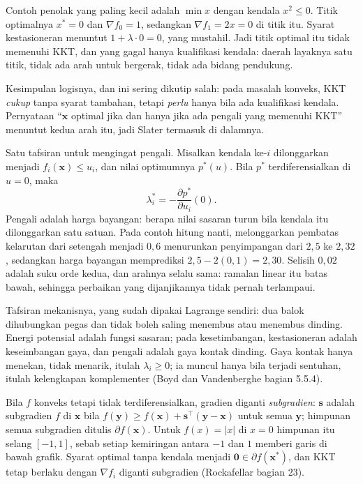 Contoh penolak yang paling kecil adalah $\min x$ dengan kendala $x^{2}\le0$. Titik
optimalnya $x^{*}=0$ dan $\nabla f_{0}=1$, sedangkan $\nabla f_{1}=2x=0$ di titik itu.
Syarat kestasioneran menuntut $1+\lambda\cdot0=0$, yang mustahil. Jadi titik optimal itu
tidak memenuhi KKT, dan yang gagal hanya kualifikasi kendala: daerah layaknya satu titik,
tidak ada arah untuk bergerak, tidak ada bidang pendukung.

Kesimpulan logisnya, dan ini sering dikutip salah: pada masalah konveks, KKT
\emph{cukup} tanpa syarat tambahan, tetapi \emph{perlu} hanya bila ada kualifikasi
kendala. Pernyataan ``$\mathbf{x}$ optimal jika dan hanya jika ada pengali yang memenuhi
KKT'' menuntut kedua arah itu, jadi Slater termasuk di dalamnya.

Satu tafsiran untuk mengingat pengali. Misalkan kendala ke-$i$ dilonggarkan
menjadi $f_{i}(\mathbf{x})\le u_{i}$, dan nilai optimumnya $p^{*}(u)$. Bila $p^{*}$
terdiferensialkan di $u=0$, maka
\[
  \lambda_{i}^{*}=-\frac{\partial p^{*}}{\partial u_{i}}(0).
\]
Pengali adalah harga bayangan: berapa nilai sasaran turun bila kendala itu dilonggarkan
satu satuan. Pada contoh hitung nanti, melonggarkan pembatas kelarutan dari setengah
menjadi $0{,}6$ menurunkan penyimpangan dari $2{,}5$ ke $2{,}32$, sedangkan harga bayangan
memprediksi $2{,}5-2(0{,}1)=2{,}30$. Selisih $0{,}02$ adalah suku orde
kedua, dan arahnya selalu sama: ramalan linear itu batas bawah, sehingga perbaikan yang
dijanjikannya tidak pernah terlampaui.

Tafsiran mekanisnya, yang sudah dipakai Lagrange sendiri: dua balok dihubungkan pegas dan
tidak boleh saling menembus atau menembus dinding. Energi potensial adalah fungsi sasaran;
pada kesetimbangan, kestasioneran adalah keseimbangan gaya, dan pengali adalah gaya kontak
dinding. Gaya kontak hanya menekan, tidak menarik, itulah $\lambda_{i}\ge0$; ia muncul
hanya bila terjadi sentuhan, itulah kelengkapan komplementer (Boyd dan Vandenberghe bagian
5.5.4).

\begin{catatan}[Subgradien]
Bila $f$ konveks tetapi tidak terdiferensialkan, gradien diganti \emph{subgradien}:
$\mathbf{s}$ adalah subgradien $f$ di $\mathbf{x}$ bila
$f(\mathbf{y})\ge f(\mathbf{x})+\mathbf{s}^{\top}(\mathbf{y}-\mathbf{x})$ untuk semua
$\mathbf{y}$; himpunan semua subgradien ditulis $\partial f(\mathbf{x})$. Untuk
$f(x)=|x|$ di $x=0$ himpunan itu selang $[-1,1]$, sebab setiap kemiringan antara $-1$
dan $1$ memberi garis di bawah grafik. Syarat optimal tanpa kendala menjadi
$\mathbf{0}\in\partial f(\mathbf{x}^{*})$, dan KKT tetap berlaku dengan $\nabla f_{i}$
diganti subgradien (Rockafellar bagian 23).
\end{catatan}

